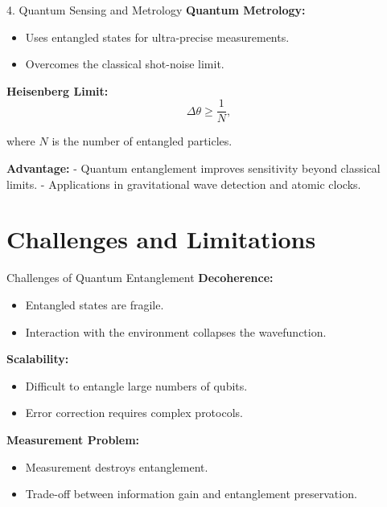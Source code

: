 \documentclass{beamer}
\begin{document}
\begin{frame}{4. Quantum Sensing and Metrology}
\textbf{Quantum Metrology:}
\begin{itemize}
    \item Uses entangled states for ultra-precise measurements.
    \item Overcomes the classical shot-noise limit.
\end{itemize}

\textbf{Heisenberg Limit:}
\[
\Delta \theta \ge \frac{1}{N},
\]

where \( N \) is the number of entangled particles.  
\pause

\textbf{Advantage:}
- Quantum entanglement improves sensitivity beyond classical limits.
- Applications in gravitational wave detection and atomic clocks.
\end{frame}

\section{Challenges and Limitations}
\begin{frame}{Challenges of Quantum Entanglement}
\textbf{Decoherence:}
\begin{itemize}
    \item Entangled states are fragile.
    \item Interaction with the environment collapses the wavefunction.
\end{itemize}

\textbf{Scalability:}
\begin{itemize}
    \item Difficult to entangle large numbers of qubits.
    \item Error correction requires complex protocols.
\end{itemize}

\textbf{Measurement Problem:}
\begin{itemize}
    \item Measurement destroys entanglement.
    \item Trade-off between information gain and entanglement preservation.
\end{itemize}
\end{frame}

\end{document}
